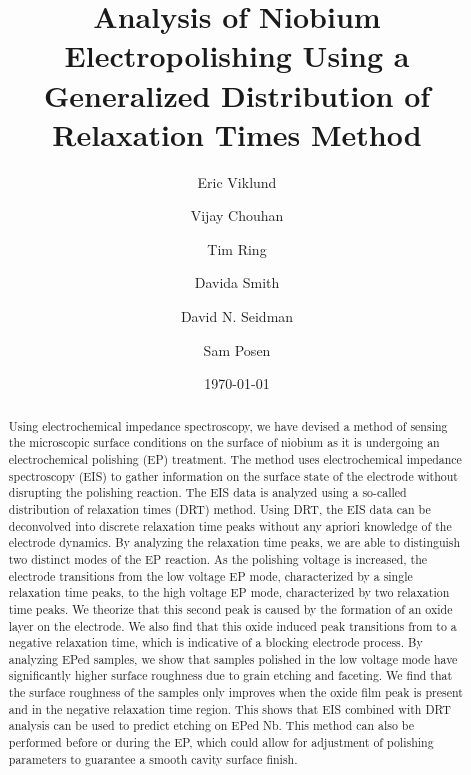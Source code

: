 \documentclass{revtex4-2}
\begin{document}
\title{Analysis of Niobium Electropolishing Using a Generalized Distribution of Relaxation Times Method}
\author{Eric Viklund}%
%
%
\author{Vijay Chouhan}%
%
\author{Tim Ring}%
%
\author{Davida Smith}%
%
\author{David N. Seidman}%
%
\author{Sam Posen}%
%
\date{\today}

\begin{abstract}
  Using electrochemical impedance spectroscopy, we have devised a method of sensing the microscopic surface conditions on the surface of niobium as it is undergoing an electrochemical polishing (EP) treatment. The method uses electrochemical impedance spectroscopy (EIS) to gather information on the surface state of the electrode without disrupting the polishing reaction. The EIS data is analyzed using a so-called distribution of relaxation times (DRT) method. Using DRT, the EIS data can be deconvolved into discrete relaxation time peaks without any apriori knowledge of the electrode dynamics. By analyzing the relaxation time peaks, we are able to distinguish two distinct modes of the EP reaction. As the polishing voltage is increased, the electrode transitions from the low voltage EP mode, characterized by a single relaxation time peaks, to the high voltage EP mode, characterized by two relaxation time peaks. We theorize that this second peak is caused by the formation of an oxide layer on the electrode. We also find that this oxide induced peak transitions from to a negative relaxation time, which is indicative of a blocking electrode process. By analyzing EPed samples, we show that samples polished in the low voltage mode have significantly higher surface roughness due to grain etching and faceting. We find that the surface roughness of the samples only improves when the oxide film peak is present and in the negative relaxation time region. This shows that EIS combined with DRT analysis can be used to predict etching on EPed Nb. This method can also be performed before or during the EP, which could allow for adjustment of polishing parameters to guarantee a smooth cavity surface finish.
\end{abstract}

\maketitle






\end{document}
